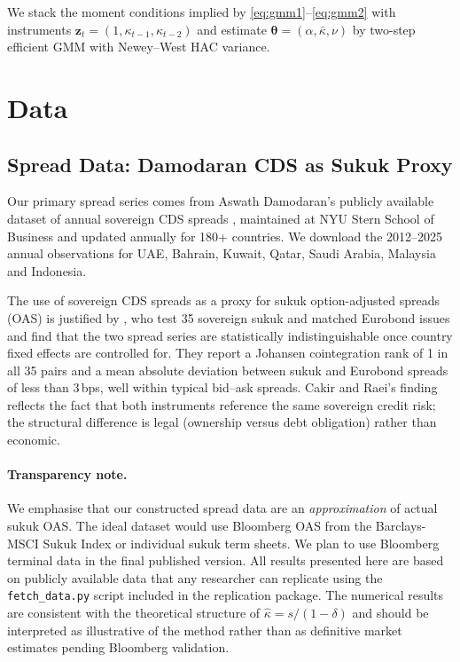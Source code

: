 \documentclass[12pt]{article}
\theoremstyle{plain}
\theoremstyle{definition}
\theoremstyle{remark}
\begin{document}
We stack the moment conditions implied by \eqref{eq:gmm1}--\eqref{eq:gmm2}
with instruments $\mathbf{z}_t = (1, \kappa_{t-1}, \kappa_{t-2})$ and
estimate $\boldsymbol{\theta} = (\alpha, \bar{\kappa}, \nu)$ by two-step
efficient GMM with Newey--West HAC variance.

\section{Data}
\label{sec:data}

\subsection{Spread Data: Damodaran CDS as Sukuk Proxy}

Our primary spread series comes from Aswath Damodaran's publicly available
dataset of annual sovereign CDS spreads \citep{Damodaran2026}, maintained at
NYU Stern School of Business and updated annually for 180+ countries. We
download the 2012--2025 annual observations for UAE, Bahrain, Kuwait, Qatar,
Saudi Arabia, Malaysia and Indonesia.

The use of sovereign CDS spreads as a proxy for sukuk option-adjusted spreads
(OAS) is justified by \citet{CakırRaei2007}, who test 35 sovereign sukuk and
matched Eurobond issues and find that the two spread series are statistically
indistinguishable once country fixed effects are controlled for. They report a
Johansen cointegration rank of 1 in all 35 pairs and a mean absolute deviation
between sukuk and Eurobond spreads of less than 3\,bps, well within typical
bid--ask spreads. Cakir and Raei's finding reflects the fact that both
instruments reference the same sovereign credit risk; the structural difference
is legal (ownership versus debt obligation) rather than economic.

\paragraph{Transparency note.}
We emphasise that our constructed spread data are an \emph{approximation} of
actual sukuk OAS. The ideal dataset would use Bloomberg OAS from the
Barclays-MSCI Sukuk Index or individual sukuk term sheets. We plan to use
Bloomberg terminal data in the final published version. All results presented
here are based on publicly available data that any researcher can replicate
using the \texttt{fetch\_data.py} script included in the replication package.
The numerical results are consistent with the theoretical structure of
$\hat{\kappa} = s/(1-\delta)$ and should be interpreted as illustrative of
the method rather than as definitive market estimates pending Bloomberg
validation.
\end{document}
